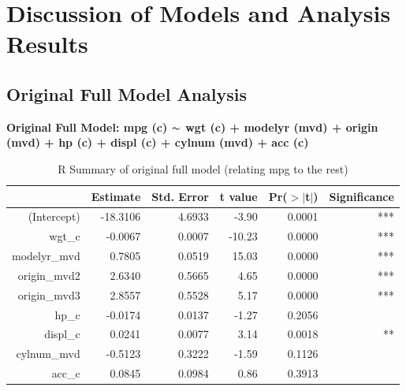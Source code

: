 \documentclass{article}
\newcommand{\mt}[1]{\ensuremath{#1}}
\newcommand{\tl}{\mt{\thicksim} }
\begin{document}
\newpage

\section{Discussion of Models and Analysis Results}

\subsection{Original Full Model Analysis}

\newpage

\textbf{Original Full Model: mpg (c) \tl wgt (c) + modelyr (mvd) + origin (mvd) + hp (c) + displ (c) + cylnum (mvd) + acc (c)}

\begin{table}[ht]
\centering
\begin{tabular}{rrrrrr}
  \hline
 & Estimate & Std. Error & t value & Pr($>$$|$t$|$) & Significance \\ 
  \hline
(Intercept) & -18.3106 & 4.6933 & -3.90 & 0.0001 & *** \\ 
  wgt\_c & -0.0067 & 0.0007 & -10.23 & 0.0000 & ***  \\ 
  modelyr\_mvd & 0.7805 & 0.0519 & 15.03 & 0.0000 & ***  \\ 
  origin\_mvd2 & 2.6340 & 0.5665 & 4.65 & 0.0000 & ***  \\ 
  origin\_mvd3 & 2.8557 & 0.5528 & 5.17 & 0.0000 & ***  \\ 
  hp\_c & -0.0174 & 0.0137 & -1.27 & 0.2056 & \\ 
  displ\_c & 0.0241 & 0.0077 & 3.14 & 0.0018 & ** \\ 
  cylnum\_mvd & -0.5123 & 0.3222 & -1.59 & 0.1126 & \\ 
  acc\_c & 0.0845 & 0.0984 & 0.86 & 0.3913 & \\ 
   \hline
\end{tabular}
\caption{R Summary of original full model (relating mpg to the rest)}
\label{tab:myfirsttable}
\end{table}
\end{document}
